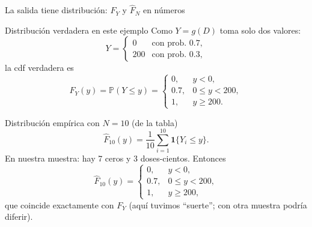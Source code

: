 \documentclass[aspectratio=1610, 9pt]{beamer}
\begin{document}
\begin{frame}{La salida tiene distribución: \texorpdfstring{$F_Y$}{FY} y \texorpdfstring{$\widehat F_N$}{Fhat} en números}
\begin{block}{Distribución verdadera en este ejemplo}
Como $Y=g(D)$ toma solo dos valores:
\[
Y=
\begin{cases}
0 & \text{con prob. } 0.7,\\
200 & \text{con prob. } 0.3,
\end{cases}
\]
la cdf verdadera es
\[
F_Y(y)=\mathbb P(Y\le y)=
\begin{cases}
0, & y<0,\\
0.7, & 0\le y<200,\\
1, & y\ge 200.
\end{cases}
\]
\end{block}

\begin{block}{Distribución empírica con \texorpdfstring{$N=10$}{N=10} (de la tabla)}
\[
\widehat F_{10}(y)=\frac{1}{10}\sum_{i=1}^{10}\mathbf 1\{Y_i\le y\}.
\]
En nuestra muestra: hay 7 ceros y 3 doses-cientos. Entonces
\[
\widehat F_{10}(y)=
\begin{cases}
0, & y<0,\\
0.7, & 0\le y<200,\\
1, & y\ge 200,
\end{cases}
\]
que coincide exactamente con $F_Y$ (aquí tuvimos ``suerte''; con otra muestra podría diferir).
\end{block}
\end{frame}

\end{document}
